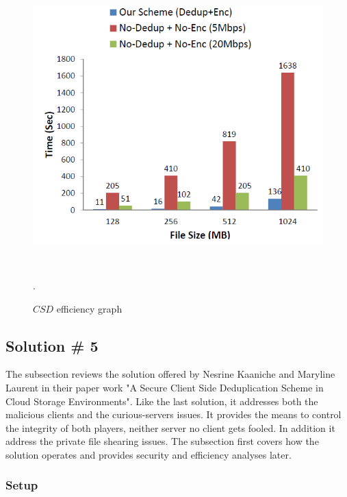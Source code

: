 \documentclass[12pt]{article}
\begin{document}
\begin{figure}[ht] 
\begin{center}
\includegraphics[height=310pt,width=400pt]{CSD}
\caption{$CSD$ efficiency graph}
\label{fig:CSD} .
\end{center}
\end{figure}

\pagebreak

\subsection{Solution \# 5}
\label{sub:Soltuion5}

The subsection reviews the solution offered by Nesrine Kaaniche and Maryline Laurent in their paper work "A Secure Client Side Deduplication Scheme in Cloud Storage Environments".\cite{Kaaniche} Like the last solution, it addresses both the malicious clients and the curious-servers issues. It provides the means to control the integrity of both players, neither server no client gets fooled. In addition it address the private file shearing issues. The subsection first covers how the solution operates and provides security and efficiency analyses later.

\subsubsection{Setup}
\label{subsub:setup5}
\end{document}
